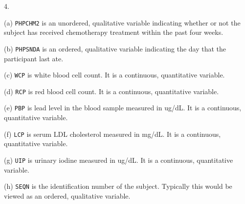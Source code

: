 \documentclass[10pt]{article}
\begin{document}
4.

(a) \texttt{PHPCHM2} is an unordered, qualitative variable indicating whether
or not the subject has received chemotherapy treatment within the past four weeks.

(b) \texttt{PHPSNDA} is an ordered, qualitative variable indicating the day that
the participant last ate.

(c) \texttt{WCP} is white blood cell count.
It is a continuous,  quantitative variable.

(d) \texttt{RCP} is red blood cell count.  
It is a continuous,  quantitative variable.

(e) \texttt{PBP} is lead level in the blood sample measured in ug/dL.  
It is a continuous,  quantitative variable.

(f) \texttt{LCP} is serum LDL cholesterol measured in mg/dL.
It is a continuous,  quantitative variable.

(g) \texttt{UIP}  is urinary iodine measured in ug/dL.  
It is a continuous,  quantitative variable.

(h) \texttt{SEQN} is the identification number of the subject.  Typically this would
be viewed as an ordered, qualitative variable.
\vfill
\eject
\end{document}
